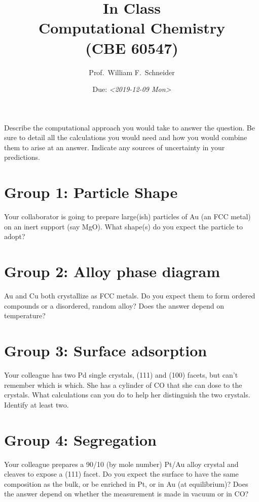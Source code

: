 \documentclass[11pt]{article}
\date{Due: \textit{<2019-12-09 Mon>}}
\title{}
\begin{document}
\title{In Class\\Computational Chemistry\\(CBE 60547)}
\author{Prof.\ William F.\ Schneider}
\maketitle

Describe the computational approach you would take to answer the question. Be sure to detail all the calculations you would need and how you would combine them to arise at an answer. Indicate any sources of uncertainty in your predictions.
\section{Group 1: Particle Shape}
\label{sec:orgcd4e66e}
Your collaborator is going to prepare large(ish) particles of Au (an FCC metal) on an inert support (say MgO). What shape(s) do you expect the particle to adopt? 

\section{Group 2: Alloy phase diagram}
\label{sec:org20605bf}
Au and Cu both crystallize as FCC metals. Do you expect them to form ordered compounds or a disordered, random alloy? Does the answer depend on temperature?

\section{Group 3: Surface adsorption}
\label{sec:orgc0b888b}
Your colleague has two Pd single crystals, (111) and (100) facets, but can't remember which is which. She has a cylinder of CO that she can dose to the crystals. What calculations can you do to help her distinguish the two crystals. Identify at least two.

\section{Group 4: Segregation}
\label{sec:orgc399163}
Your colleague prepares a 90/10 (by mole number) Pt/Au alloy crystal and cleaves to expose a (111) facet. Do you expect the surface to have the same composition as the bulk, or be enriched in Pt, or in Au (at equilibrium)?  Does the answer depend on whether the measurement is made in vacuum or in CO?
\end{document}

